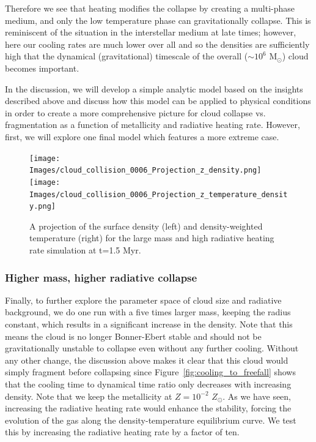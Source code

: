 \documentclass[useAMS,usenatbib]{mn2e}
\newcommand{\msun}{{M$_\odot$}}
\begin{document}
Therefore we see that heating modifies the collapse by creating a multi-phase medium, and only the low temperature phase can gravitationally collapse.  This is reminiscent of the situation in the interstellar medium at late times; however, here our cooling rates are much lower over all and so the densities are sufficiently high that the dynamical (gravitational) timescale of the overall ($\sim 10^6$ \msun) cloud becomes important.   

In the discussion, we will develop a simple analytic model based on the insights described above and discuss how this model can be applied to physical conditions in order to create a more comprehensive picture for cloud collapse vs. fragmentation as a function of metallicity and radiative heating rate.  However, first, we will explore one final model which features a more extreme case.

\begin{figure}
\begin{center}
\texttt{[image: Images/cloud\_collision\_0006\_Projection\_z\_density.png]}
\texttt{[image: Images/cloud\_collision\_0006\_Projection\_z\_temperature\_density.png]}
\end{center}
\caption{\label{fig:big_projections} A projection of the surface density (left) and density-weighted temperature (right)
for the large mass and high radiative heating rate simulation at t=1.5 Myr.}
\end{figure}

\subsubsection{Higher mass, higher radiative collapse}

Finally, to further explore the parameter space of cloud size and radiative background, we do one run with a five times larger mass,
keeping the radius constant, which results in a significant increase in the density.  Note that this means the cloud is no longer Bonner-Ebert
stable and should not be gravitationally unstable to collapse even without any further cooling.  Without any other change, the discussion above
makes it clear that this cloud would simply fragment before collapsing since Figure~\ref{fig:cooling_to_freefall} shows that the cooling
time to dynamical time ratio only decreases with increasing density.  Note that we keep the metallicity at $Z=10^{-2}$ $Z_{\odot}$. As we have seen, increasing the radiative heating rate would enhance the stability, forcing the evolution of the gas along the
density-temperature equilibrium curve. We test this by increasing the radiative heating rate by a factor of ten.
\end{document}
